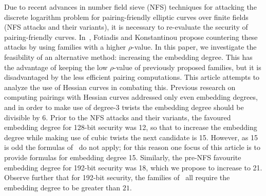 Due to recent advances in number field sieve (NFS) techniques for attacking the discrete logarithm problem
for pairing-friendly elliptic curves over finite fields~\cite{2013/jouxP}~\cite{2016/KB}~\cite{2015/BGGM}~\cite{2015/BGK} (NFS attacks and their variants),
it is necessary to re-evaluate the security of pairing-friendly curves.
In~\cite{2018/FK}, Fotiadis and Konstantinou propose countering these attacks by using families with a higher $\rho$-value. 
In this paper, we investigate the feasibility of an alternative method: increasing the embedding degree.
This has the advantage of keeping the low $\rho$-value of previously proposed families, but it is disadvantaged by the less efficient pairing computations.
This article attempts to analyze the use of Hessian curves in combating this.
Previous research on computing pairings with  Hessian curves addressed only even embedding degrees, and in order to make use of degree-3 twists the embedding degree should be divisible by 6. 
Prior to the NFS attacks and their variants, the favoured embedding degree for 128-bit security was 12, 
so that to increase the embedding degree while making use of cubic twists the next
candidate is 15. However, as 15 is odd the formulas of~\cite{2010/Gu} do not apply;
for this reason one focus of this article is to provide formulas for embedding degree 15. Similarly, the pre-NFS favourite embedding degree for 192-bit security was 18, which we propose to increase to 21.
Observe further that for 192-bit security, the families of~\cite{2018/FK} all require the embedding degree to be greater than $21$.



